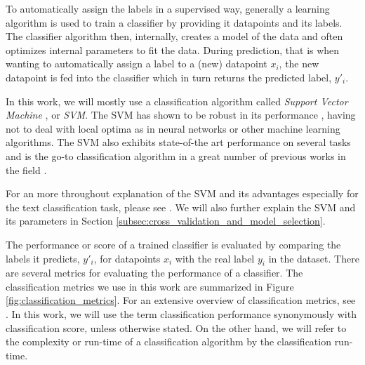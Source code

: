 To automatically assign the labels in a supervised way, generally a learning algorithm is used to train a classifier by providing it datapoints and its labels.
The classifier algorithm then, internally, creates a model of the data and often optimizes internal parameters to fit the data.
During prediction, that is when wanting to automatically assign a label to a (new) datapoint $x_i$, the new datapoint is fed into the classifier which in turn returns the predicted label, $y'_i$.

In this work, we will mostly use a classification algorithm called \textit{Support Vector Machine} \cite{Cortes1995}, or \textit{SVM}.
The SVM has shown to be robust in its performance \cite{Joachims1998}, having not to deal with local optima as in neural networks or other machine learning algorithms.
The SVM also exhibits state-of-the art performance on several tasks and is the go-to classification algorithm in a great number of previous works in the field \cite{Joachims1998, Vitale2012, Neuhaus2006a,Kriege2012, Koronacki2008}.

For an more throughout explanation of the SVM and its advantages especially for the text classification task, please see \cite{Joachims1998}.
We will also further explain the SVM and its parameters in Section \ref{subsec:cross_validation_and_model_selection}.

The performance or score of a trained classifier is evaluated by comparing the labels it predicts, $y'_i$,  for datapoints $x_i$ with the real label $y_i$ in the dataset.
There are several metrics for evaluating the performance of a classifier.
The classification metrics we use in this work are summarized in Figure \ref{fig:classification_metrics}.
For an extensive overview of classification metrics, see \cite{Forman2003}.
In this work, we will use the term classification performance synonymously with classification score, unless otherwise stated.
On the other hand, we will refer to the complexity or run-time of a classification algorithm by the classification run-time.

